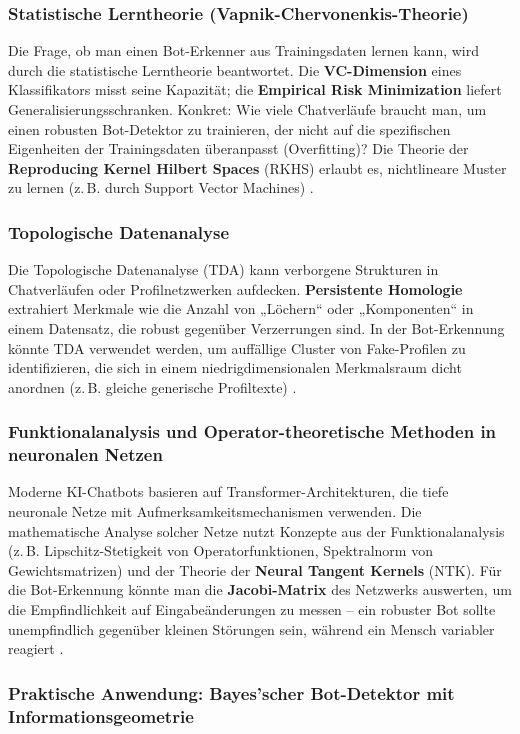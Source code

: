 \documentclass[12pt,a4paper,oneside]{scrartcl}
\begin{document}
	\subsubsection{Statistische Lerntheorie (Vapnik-Chervonenkis-Theorie)}
	Die Frage, ob man einen Bot-Erkenner aus Trainingsdaten lernen kann, wird durch die statistische Lerntheorie beantwortet. Die \textbf{VC-Dimension} eines Klassifikators misst seine Kapazität; die \textbf{Empirical Risk Minimization} liefert Generalisierungsschranken. Konkret: Wie viele Chatverläufe braucht man, um einen robusten Bot-Detektor zu trainieren, der nicht auf die spezifischen Eigenheiten der Trainingsdaten überanpasst (Overfitting)? Die Theorie der \textbf{Reproducing Kernel Hilbert Spaces} (RKHS) erlaubt es, nichtlineare Muster zu lernen (z.\,B. durch Support Vector Machines) \cite{Vapnik1998}.
	
	\subsubsection{Topologische Datenanalyse}
	Die Topologische Datenanalyse (TDA) kann verborgene Strukturen in Chatverläufen oder Profilnetzwerken aufdecken. \textbf{Persistente Homologie} extrahiert Merkmale wie die Anzahl von „Löchern“ oder „Komponenten“ in einem Datensatz, die robust gegenüber Verzerrungen sind. In der Bot-Erkennung könnte TDA verwendet werden, um auffällige Cluster von Fake-Profilen zu identifizieren, die sich in einem niedrigdimensionalen Merkmalsraum dicht anordnen (z.\,B. gleiche generische Profiltexte) \cite{EdelsbrunnerHarer2010}.
	
	\subsubsection{Funktionalanalysis und Operator-theoretische Methoden in neuronalen Netzen}
	Moderne KI-Chatbots basieren auf Transformer-Architekturen, die tiefe neuronale Netze mit Aufmerksamkeitsmechanismen verwenden. Die mathematische Analyse solcher Netze nutzt Konzepte aus der Funktionalanalysis (z.\,B. Lipschitz-Stetigkeit von Operatorfunktionen, Spektralnorm von Gewichtsmatrizen) und der Theorie der \textbf{Neural Tangent Kernels} (NTK). Für die Bot-Erkennung könnte man die \textbf{Jacobi-Matrix} des Netzwerks auswerten, um die Empfindlichkeit auf Eingabeänderungen zu messen – ein robuster Bot sollte unempfindlich gegenüber kleinen Störungen sein, während ein Mensch variabler reagiert \cite{Goodfellow2016}.
	
	\subsubsection{Praktische Anwendung: Bayes’scher Bot-Detektor mit Informationsgeometrie}
	
\end{document}
